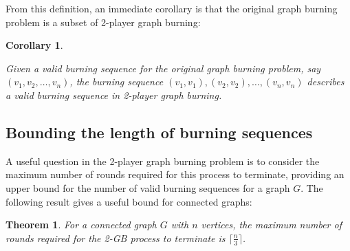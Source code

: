 \documentclass{mpaper}
\newtheorem{corollary}{Corollary}[section]
\newtheorem{theorem}{Theorem}[section]
\begin{document}
From this definition, an immediate corollary is that the original graph burning problem is a subset of 2-player graph burning:

\begin{corollary}
\label{cor/burning-subset}

Given a valid burning sequence for the original graph burning problem, say $(v_1, v_2, \dots, v_n)$, the burning sequence $(v_1, v_1), (v_2, v_2), \dots, (v_n, v_n)$ describes a valid burning sequence in 2-player graph burning.

\end{corollary}

\subsection{Bounding the length of burning sequences}

A useful question in the 2-player graph burning problem is to consider the maximum number of rounds required for this process to terminate, providing an upper bound for the number of valid burning sequences for a graph $G$. The following result gives a useful bound for connected graphs:

\begin{theorem}
  \label{thm/connected-bound}
  For a connected graph $G$ with $n$ vertices, the maximum number of rounds required for the 2-GB process to terminate is $\lceil \frac{n}{3} \rceil$.
\end{theorem}
\end{document}
